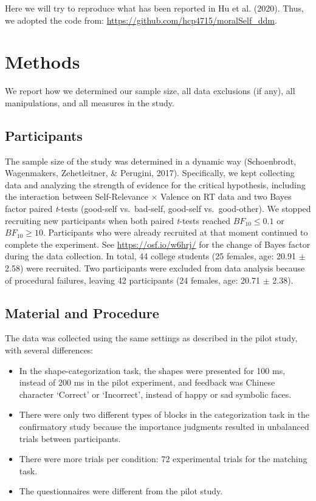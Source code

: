 \documentclass[
  man]{apa6}
\providecommand{\tightlist}{%
  \setlength{\itemsep}{0pt}\setlength{\parskip}{0pt}}
\begin{document}
Here we will try to reproduce what has been reported in Hu et al. (2020). Thus, we adopted the code from: \url{https://github.com/hcp4715/moralSelf_ddm}.

\section{Methods}\label{methods}

We report how we determined our sample size, all data exclusions (if any), all manipulations, and all measures in the study.

\subsection{Participants}\label{participants}

The sample size of the study was determined in a dynamic way (Schoenbrodt, Wagenmakers, Zehetleitner, \& Perugini, 2017). Specifically, we kept collecting data and analyzing the strength of evidence for the critical hypothesis, including the interaction between Self-Relevance × Valence on RT data and two Bayes factor paired \emph{t}-tests (good-self vs.~bad-self, good-self vs.~good-other). We stopped recruiting new participants when both paired \emph{t}-tests reached \(BF_{10} \le 0.1\) or \(BF_{10} \ge 10\). Participants who were already recruited at that moment continued to complete the experiment. See \url{https://osf.io/w6hrj/} for the change of Bayes factor during the data collection. In total, 44 college students (25 females, age: 20.91 \(\pm\) 2.58) were recruited. Two participants were excluded from data analysis because of procedural failures, leaving 42 participants (24 females, age: 20.71 \(\pm\) 2.38).

\subsection{Material and Procedure}\label{material-and-procedure}

The data was collected using the same settings as described in the pilot study, with several differences:

\begin{itemize}
\tightlist
\item
  In the shape-categorization task, the shapes were presented for 100 ms, instead of 200 ms in the pilot experiment, and feedback was Chinese character `Correct' or `Incorrect', instead of happy or sad symbolic faces.
\item
  There were only two different types of blocks in the categorization task in the confirmatory study because the importance judgments resulted in unbalanced trials between participants.
\item
  There were more trials per condition: 72 experimental trials for the matching task.
\item
  The questionnaires were different from the pilot study.
\end{itemize}
\end{document}
